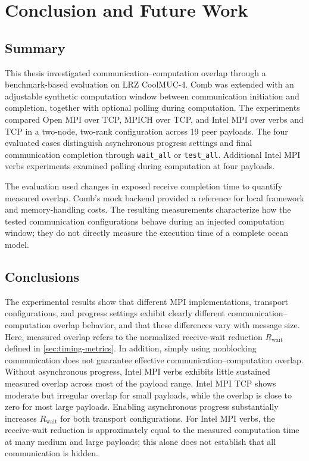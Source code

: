 
\chapter{Conclusion and Future Work}\label{chapter:conclusion}

\section{Summary}

This thesis investigated communication--computation overlap through a
benchmark-based evaluation on LRZ CoolMUC-4. Comb was extended with an
adjustable synthetic computation window between communication initiation
and completion, together with optional polling during computation. The
experiments compared Open MPI over TCP, MPICH over TCP, and Intel MPI over
verbs and TCP in a two-node, two-rank configuration across 19 peer payloads.
The four evaluated cases distinguish asynchronous progress settings and
final communication completion through \texttt{wait\_all} or
\texttt{test\_all}. Additional Intel MPI verbs experiments examined polling
during computation at four payloads.

The evaluation used changes in exposed receive completion time to quantify
measured overlap. Comb's mock backend provided a reference for local
framework and memory-handling costs. The resulting measurements characterize
how the tested communication configurations behave during an injected
computation window; they do not directly measure the execution time of a
complete ocean model.

\section{Conclusions}

The experimental results show that different MPI implementations, transport configurations, and progress settings exhibit clearly different communication--computation overlap behavior, and that these differences vary with message size. Here, measured overlap refers to the normalized receive-wait reduction $R_{\mathrm{wait}}$ defined in \autoref{sec:timing-metrics}. In addition, simply using nonblocking communication does not guarantee effective communication--computation overlap. Without asynchronous progress, Intel MPI verbs exhibits little sustained measured overlap across most of the payload range. Intel MPI TCP shows moderate but irregular overlap for small payloads, while the overlap is close to zero for most large payloads. Enabling asynchronous progress substantially increases $R_{\mathrm{wait}}$ for both transport configurations. For Intel MPI verbs, the receive-wait reduction is approximately equal to the measured computation time at many medium and large payloads; this alone does not establish that all communication is hidden.


